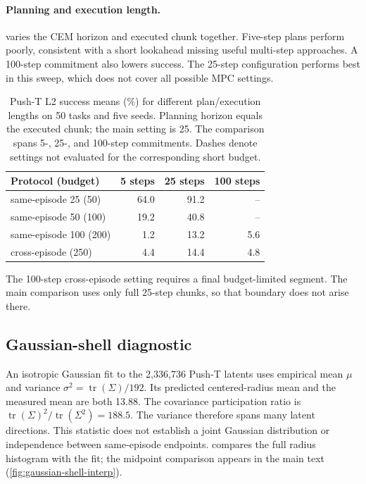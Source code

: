 \documentclass{article}
\theoremstyle{definition}
\theoremstyle{remark}
\begin{document}
\paragraph{Planning and execution length.}
 varies the CEM horizon and executed chunk together.
Five-step plans perform poorly, consistent with a short lookahead missing useful
multi-step approaches. A 100-step commitment also lowers success. The 25-step
configuration performs best in this sweep, which does not cover all possible MPC settings.
\begin{table}[h]
\centering\small
\caption{Push-T L2 success means (\%) for different plan/execution lengths on 50 tasks
and five seeds. Planning horizon equals the executed chunk; the main setting is 25.
The comparison spans 5-, 25-, and 100-step commitments.
Dashes denote settings not evaluated for the corresponding short budget.}
\label{tab:replan-frequency-appendix}
\begin{tabular}{lrrr}
\toprule
Protocol (budget) &5 steps&25 steps&100 steps\\
\midrule
same-episode 25 (50)&64.0&91.2&--\\
same-episode 50 (100)&19.2&40.8&--\\
same-episode 100 (200)&1.2&13.2&5.6\\
cross-episode (250)&4.4&14.4&4.8\\
\bottomrule
\end{tabular}
\end{table}
The 100-step cross-episode setting requires a final budget-limited segment.
The main comparison uses only full 25-step chunks, so that boundary does not arise there.

\subsection{Gaussian-shell diagnostic}
\label{app:gaussian-shell}
An isotropic Gaussian fit to the 2,336,736 Push-T latents uses empirical mean $\mu$
and variance $\sigma^2=\operatorname{tr}(\Sigma)/192$.
Its predicted centered-radius mean and the measured mean are both 13.88.
The covariance participation ratio is
$\operatorname{tr}(\Sigma)^2/\operatorname{tr}(\Sigma^2)=188.5$.
The variance therefore spans many latent directions. This statistic does not establish
a joint Gaussian distribution or independence between same-episode endpoints.
 compares the full radius histogram with the fit;
the midpoint comparison appears in the main text (\cref{fig:gaussian-shell-interp}).
\end{document}
